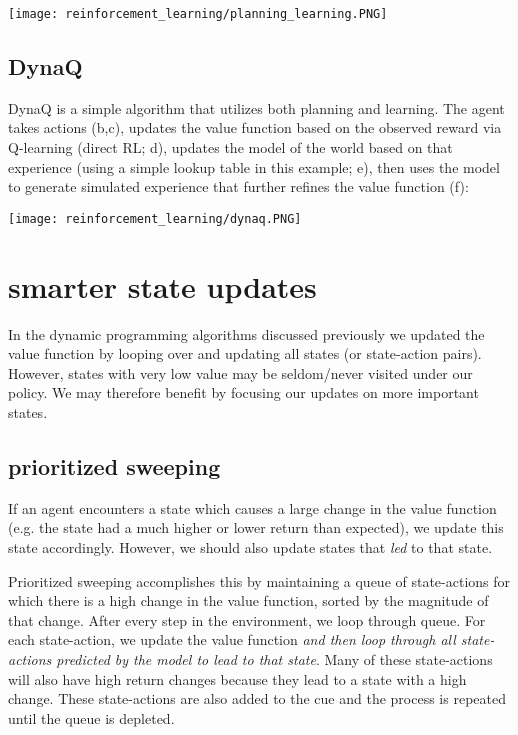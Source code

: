 \begin{center}\texttt{[image: reinforcement\_learning/planning\_learning.PNG]}\end{center}

\subsection{DynaQ}
DynaQ is a simple algorithm that utilizes both planning and learning. The agent takes actions (b,c), updates the value function based on the observed reward via Q-learning (direct RL; d), updates the model of the world based on that experience (using a simple lookup table in this example; e), then uses the model to generate simulated experience that further refines the value function (f):

\begin{center}\texttt{[image: reinforcement\_learning/dynaq.PNG]}\end{center}

\section{smarter state updates}
In the dynamic programming algorithms discussed previously we updated the value function by looping over and updating all states (or state-action pairs). However, states with very low value may be seldom/never visited under our policy. We may therefore benefit by focusing our updates on more important states.

\subsection{prioritized sweeping}
If an agent encounters a state which causes a large change in the value function (e.g. the state had a much higher or lower return than expected), we update this state accordingly. However, we should also update states that \textit{led} to that state.

Prioritized sweeping accomplishes this by maintaining a queue of state-actions for which there is a high change in the value function, sorted by the magnitude of that change. After every step in the environment, we loop through queue. For each state-action, we update the value function \textit{and then loop through all state-actions predicted by the model to lead to that state}. Many of these state-actions will also have high return changes because they lead to a state with a high change. These state-actions are also added to the cue and the process is repeated until the queue is depleted.

